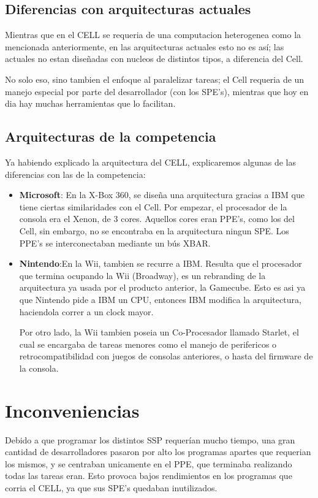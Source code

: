 \documentclass[11pt,compsoc]{IEEEtran}
\begin{document}
	\subsection{Diferencias con arquitecturas actuales}
	\noindent Mientras que en el CELL se requeria de una computacion heterogenea como la mencionada anteriormente, en las arquitecturas actuales esto no es así; las actuales no estan diseñadas con nucleos de distintos tipos, a diferencia del Cell.
	
	No solo eso, sino tambien el enfoque al paralelizar tareas; el Cell requeria de un manejo especial por parte del desarrollador (con los SPE's), mientras que hoy en dia hay muchas herramientas que lo facilitan.
	
	\subsection{Arquitecturas de la competencia}%
	\noindent Ya habiendo explicado la arquitectura del CELL, explicaremos algunas de las diferencias con las de la competencia:
	
	\begin{itemize}
				
		\item{{\bf{Microsoft}}: En la X-Box 360, se diseña una arquitectura gracias a IBM que tiene ciertas similaridades con el Cell. Por empezar, el procesador de la consola era el Xenon, de 3 cores. Aquellos cores eran PPE's, como los del Cell, sin embargo, no se encontraba en la arquitectura ningun SPE. Los PPE's se interconectaban mediante un bús XBAR.}\newline
		
		\item{{\bf{Nintendo}}:En la Wii, tambien se recurre a IBM. Resulta que el procesador que termina ocupando la Wii (Broadway), es un rebranding de la arquitectura ya usada por el producto anterior, la Gamecube. Esto es asi ya que Nintendo pide a IBM un CPU, entonces IBM modifica la arquitectura, haciendola correr a un clock mayor.\newline
		
		Por otro lado, la Wii tambien poseia un Co-Procesador llamado Starlet, el cual se encargaba de tareas menores como el manejo de perifericos o retrocompatibilidad con juegos de consolas anteriores, o hasta del firmware de la consola.}
	\end{itemize}
	
	\section{Inconveniencias}
	\noindent Debido a que programar los distintos SSP requerían mucho tiempo, una gran cantidad  de desarrolladores pasaron por alto los programas apartes que requerian los mismos, y se centraban unicamente en el PPE, que terminaba realizando todas las tareas eran. Esto provoca bajos rendimientos en los programas que corria el CELL, ya que sus SPE's quedaban inutilizados.\newline
	
\end{document}
